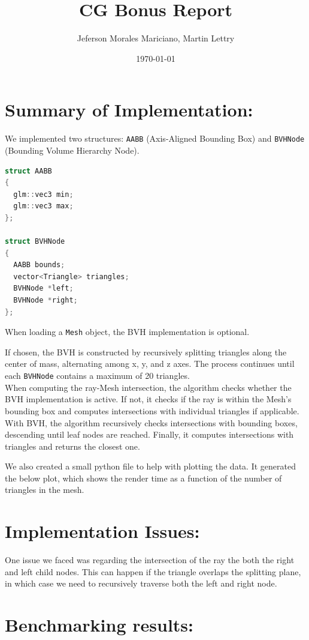 \documentclass{article}
\title{CG Bonus Report}
\author{Jeferson Morales Mariciano, Martin Lettry}
\date{\today}
\begin{document}
\maketitle

\section*{Summary of Implementation:}
We implemented two structures: \texttt{AABB} (Axis-Aligned Bounding Box) and \texttt{BVHNode} (Bounding Volume Hierarchy Node).

\begin{lstlisting}[language=C++]
struct AABB
{
  glm::vec3 min;
  glm::vec3 max;
};

struct BVHNode
{
  AABB bounds;
  vector<Triangle> triangles;
  BVHNode *left;
  BVHNode *right;
};
\end{lstlisting}

When loading a \texttt{Mesh} object, the BVH implementation is optional.

If chosen, the BVH is constructed by recursively splitting triangles along the center of mass, alternating among x, y, and z axes.
The process continues until each \texttt{BVHNode} contains a maximum of 20 triangles.\\

When computing the ray-Mesh intersection, the algorithm checks whether the BVH implementation is active.
If not, it checks if the ray is within the Mesh's bounding box and computes intersections with individual triangles if applicable.
With BVH, the algorithm recursively checks intersections with bounding boxes, descending until leaf nodes are reached.
Finally, it computes intersections with triangles and returns the closest one.


We also created a small python file to help with plotting the data.
It generated the below plot, which shows the render time as a function of the number of triangles in the mesh.


\section*{Implementation Issues:}

One issue we faced was regarding the intersection of the ray the both the right and left child nodes.
This can happen if the triangle overlaps the splitting plane, in which case we need to recursively traverse both the left and right node.


\section*{Benchmarking results:}
\end{document}
